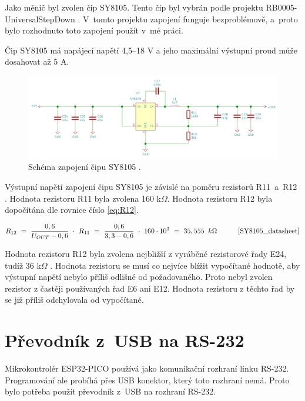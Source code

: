   Jako měnič byl zvolen čip SY8105. Tento čip byl vybrán podle projektu RB0005-UniversalStepDown \cite{UniversalStepDown}. 
  V~tomto projektu zapojení funguje bezproblémově, a~proto bylo rozhodnuto toto zapojení použít v~mé práci. 

  Čip SY8105 má napájecí napětí 4,5--18 V a jeho maximální výstupní proud může dosahovat až 5 A.

  \begin{figure}[!h]
    \begin{center}
      \includegraphics[scale=0.41]{obrazky/SY8105_schema.png}
    \end{center}
    \caption[Schéma zapojení čipu SY8105 \cite{SY8105_datasheet}]{Schéma zapojení čipu SY8105 \cite{SY8105_datasheet}.}
  \end{figure}

  Výstupní napětí zapojení čipu SY8105 je závislé na poměru rezistorů R11~a~R12 \cite{SY8105_datasheet}. 
  Hodnota rezistoru R11 byla zvolena 160 k$\Omega$. Hodnota rezistoru R12 byla dopočítána dle 
  rovnice číslo \ref{eq:R12}.

  \begin{equation} 
    R_{12}~=~\frac{0,6}{U_{OUT}-0,6}~\cdot~R_{11}~=~\frac{0,6}{3,3-0,6}~\cdot~160\cdot10^3~=~35,555~\:k\Omega 
    \quad \quad \quad \cite{SY8105_datasheet}
  \label{eq:R12}
  \end{equation}

  Hodnota rezistoru R12 byla zvolena nejbližší z vyráběné rezistorové řady E24, tudíž 36 k$\Omega$ \cite{Rezistorova_rada}. Hodnota 
  rezistoru se musí co nejvíce blížit vypočítané hodnotě, aby výstupní napětí nebylo příliš odlišné od požadovaného. Proto nebyl
  zvolen rezistor z častěji používaných řad E6 ani E12. Hodnota rezistoru z těchto řad by se již příliš odchylovala od vypočítané.

  \section{Převodník z~USB na RS-232}
  Mikrokontrolér ESP32-PICO používá jako komunikační rozhraní linku RS-232. Programování ale probíhá přes USB konektor, který toto rozhraní
  nemá. Proto bylo potřeba použít převodník z~USB na rozhraní RS-232.
  
